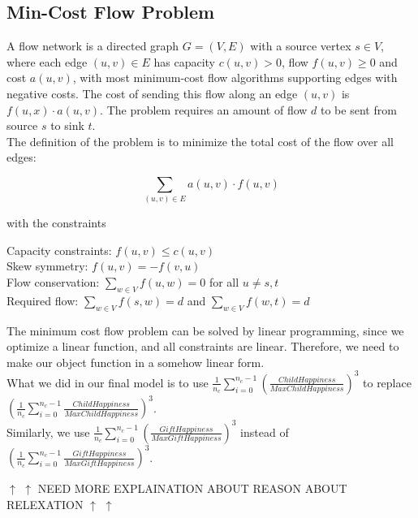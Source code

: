 \documentclass[12pt]{article}
\begin{document}
\subsection{Min-Cost Flow Problem}
A flow network is a directed graph $G = (V, E)$ with a source vertex $s \in V$, where each edge $(u,v) \in E$ has capacity $c(u,v) > 0$, flow $f(u,v) \geq 0$ and cost $a(u,v)$, with most minimum-cost flow algorithms supporting edges with negative costs. The cost of sending this flow along an edge $(u,v)$ is $f(u,x) \cdot a(u,v)$. The problem requires an amount of flow $d$ to be sent from source $s$ to sink $t$.\\
The definition of the problem is to minimize the total cost of the flow over all edges:
\begin{center}
  \begin{displaymath}
    \sum_{(u,v)\in E}{a(u,v) \cdot f(u,v)}
  \end{displaymath}
\end{center}
with the constraints
\begin{flushleft}
  Capacity constraints: $f(u,v) \leq c(u,v)$ \\
  Skew symmetry: $f(u,v) = -f(v,u)$\\
  Flow conservation: $\sum_{w \in V}{f(u,w)=0}$ for all $u \neq s, t$\\
  Required flow: $\sum_{w \in V}{f(s,w) = d}$ and $\sum_{w \in V}{f(w,t) = d}$
\end{flushleft}
The minimum cost flow problem can be solved by linear programming, since we optimize a linear function, and all constraints are linear. Therefore, we need to make our object function in a somehow linear form. \\
What we did in our final model is to use $\frac{1}{n_c}\sum_{i=0}^{n_c -1}(\frac{ChildHappiness}{MaxChildHappiness})^3$ to replace $(\frac{1}{n_c}\sum_{i=0}^{n_c -1}\frac{ChildHappiness}{MaxChildHappiness})^3$.\\ Similarly, we use $\frac{1}{n_c}\sum_{i=0}^{n_c -1}(\frac{GiftHappiness}{MaxGiftHappiness})^3$ instead of $(\frac{1}{n_c}\sum_{i=0}^{n_c -1}\frac{GiftHappiness}{MaxGiftHappiness})^3$.
\\
\begin{center}
  $\uparrow$ $\uparrow$ {\color{red}NEED MORE EXPLAINATION ABOUT REASON ABOUT RELEXATION} $\uparrow$ $\uparrow$
\end{center}
\end{document}
